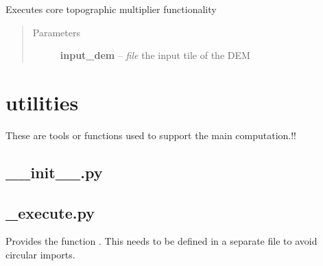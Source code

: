\documentclass[letterpaper,10pt,english]{sphinxmanual}
\begin{document}

\begin{fulllineitems}
\label{docs/topographic:topomult.topomult}
Executes core topographic multiplier functionality
\begin{quote}\begin{description}
\item[{Parameters}] \leavevmode
\textbf{input\_dem} -- \emph{file} the input tile of the DEM

\end{description}\end{quote}

\end{fulllineitems}



\section{utilities}
\label{docs/utilities::doc}\label{docs/utilities:utilities}
These are tools or functions used to support the main computation.!!


\subsection{\_\_init\_\_.py}
\label{docs/utilities:init-py}\label{docs/utilities:module-__init__}

\subsection{\_execute.py}
\label{docs/utilities:execute-py}\label{docs/utilities:module-_execute}
Provides the function {\hyperref[docs/utilities:_execute.execute]{}}. This needs to be defined in a separate file to avoid
circular imports.

\end{document}
